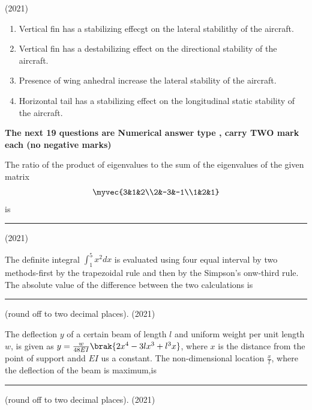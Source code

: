 	\hfill{(2021)}
          \begin{enumerate}
              \item Vertical fin has a stabilizing effecgt on the lateral stabilithy of the aircraft.
              \item Vertical fin has a destabilizing effect on the directional stability of the aircraft.
              \item Presence of wing anhedral increase the lateral stability of the aircraft. 
              \item Horizontal tail has a stabilizing effect on the longitudinal static stability of the aircraft.
          \end{enumerate}
\textbf{The next 19 questions are Numerical answer type , carry TWO mark each (no negative marks)}
    \item The ratio of the product of eigenvalues to the sum of the eigenvalues of the given matrix
            \begin{align*}
                \myvec{3&1&2\\2&-3&-1\\1&2&1}
            \end{align*}
            is \rule{1cm}{0.15mm} 
            \hfill{(2021)}
	\item The definite integral $\int_1^5x^2dx$ is evaluated using four equal interval by two methods-first by the trapezoidal rule and then by the Simpson's onw-third rule. The absolute value of the difference between the two calculations is \rule{1cm}{0.15mm} (round off to two decimal places).
	\hfill{(2021)}
	\item  The deflection $y$ of a certain beam of length $l$ and uniform weight per unit length $w$, is given as $y=\frac{w}{48EI}\brak{2x^4-3lx^3+l^3x}$, where $x$ is the distance from the point of support andd $EI$ us a constant. The non-dimensional location $\frac{x}{l}$, where the deflection of the beam is maximum,is \rule{1cm}{0.15mm} (round off to two decimal places).  
	\hfill{(2021)}
	


